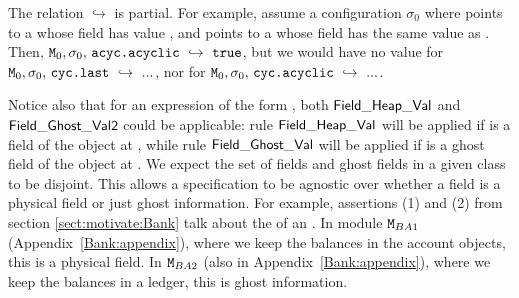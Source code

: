 The relation $ \hookrightarrow$ is partial. 
For example, assume   a configuration
$\sigma_0$ where
 points to a  whose field  has value , and   
 points to a  whose field  has the same value as . Then,   
$\M_0,\sigma_0,\,\prg{acyc.acyclic}  \ \hookrightarrow\  \prg{true}$, but we would have no value for 
$\M_0,\sigma_0,\, \prg{cyc.last}  \ \hookrightarrow\  ...$, nor for
$\M_0,\sigma_0,\, \prg{cyc.acyclic}  \ \hookrightarrow\  ...$.

Notice also that for an expression of the form  
, both ${\sf {Field\_Heap\_Val}}$ and ${\sf {Field\_Ghost\_Val2}}$ could be applicable: rule ${\sf {Field\_Heap\_Val}}$
will be applied if  is a field of the object at , while rule ${\sf {Field\_Ghost\_Val}}$
will be applied if  is a ghost field of the object at . We expect the set of fields and ghost fields in a 
given class to be disjoint.
This allows a specification to be agnostic over whether a field is a physical field or just ghost information.
For example, assertions (1) and (2) from  section  \ref{sect:motivate:Bank}
 talk about the  of an . 
In module ${\mbox{\tt{\ensuremath{{\mbox{\tt{M}}}}}}}_{BA1}$ (Appendix~\ref{Bank:appendix}), where we keep the balances in the account objects, this is a physical field. 
In ${\mbox{\tt{\ensuremath{{\mbox{\tt{M}}}}}}}_{BA2}$ (also in Appendix~\ref{Bank:appendix}), where we keep the
balances in a ledger, this is ghost information.  
 


